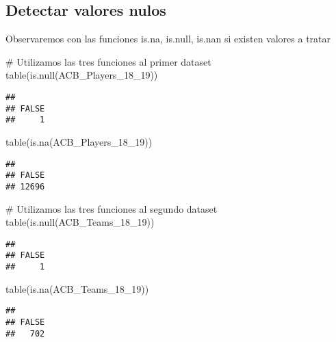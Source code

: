 \documentclass[]{article}
\newenvironment{Shaded}{\begin{snugshade}}{\end{snugshade}}
\newcommand{\KeywordTok}[1]{\textcolor[rgb]{0.94,0.87,0.69}{#1}}
\newcommand{\DecValTok}[1]{\textcolor[rgb]{0.86,0.86,0.80}{#1}}
\newcommand{\CommentTok}[1]{\textcolor[rgb]{0.50,0.62,0.50}{#1}}
\newcommand{\NormalTok}[1]{\textcolor[rgb]{0.80,0.80,0.80}{#1}}
\begin{document}
\subsection{Detectar valores nulos}\label{detectar-valores-nulos}

Observaremos con las funciones is.na, is.null, is.nan si existen valores
a tratar

\begin{Shaded}
\begin{Highlighting}[]
\CommentTok{# Utilizamos las tres funciones al primer dataset}
\KeywordTok{table}\NormalTok{(}\KeywordTok{is.null}\NormalTok{(ACB_Players_18_}\DecValTok{19}\NormalTok{))}
\end{Highlighting}
\end{Shaded}

\begin{verbatim}
## 
## FALSE 
##     1
\end{verbatim}

\begin{Shaded}
\begin{Highlighting}[]
\KeywordTok{table}\NormalTok{(}\KeywordTok{is.na}\NormalTok{(ACB_Players_18_}\DecValTok{19}\NormalTok{))}
\end{Highlighting}
\end{Shaded}

\begin{verbatim}
## 
## FALSE 
## 12696
\end{verbatim}

\begin{Shaded}
\begin{Highlighting}[]
\CommentTok{# Utilizamos las tres funciones al segundo dataset}
\KeywordTok{table}\NormalTok{(}\KeywordTok{is.null}\NormalTok{(ACB_Teams_18_}\DecValTok{19}\NormalTok{))}
\end{Highlighting}
\end{Shaded}

\begin{verbatim}
## 
## FALSE 
##     1
\end{verbatim}

\begin{Shaded}
\begin{Highlighting}[]
\KeywordTok{table}\NormalTok{(}\KeywordTok{is.na}\NormalTok{(ACB_Teams_18_}\DecValTok{19}\NormalTok{))}
\end{Highlighting}
\end{Shaded}

\begin{verbatim}
## 
## FALSE 
##   702
\end{verbatim}
\end{document}
